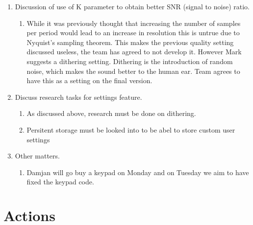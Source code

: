 \documentclass[11pt,a4paper]{scrartcl}
\begin{document}
\begin{enumerate}
\item Discussion of use of K parameter to obtain better SNR (signal to noise) ratio.
\begin{enumerate}
    \item While it was previously thought that increasing the number of samples per period would lead to an increase in resolution this is untrue due to Nyquist's sampling theorem. This makes the previous quality setting discussed useless, the team has agreed to not develop it. However Mark suggests a dithering setting. Dithering is the introduction of random noise, which makes the sound better to the human ear. Team agrees to have this as a setting on the final version.
\end{enumerate}

\item Discuss research tasks for settings feature.
\begin{enumerate}
    \item As discussed above, research must be done on dithering.
    \item Persitent storage must be looked into to be abel to store custom user settings
\end{enumerate}

\item Other matters.
\begin{enumerate}
    \item Damjan will go buy a keypad on Monday and on Tuesday we aim to have fixed the keypad code.
\end{enumerate}

\end{enumerate}

\section*{Actions}
\end{document}

